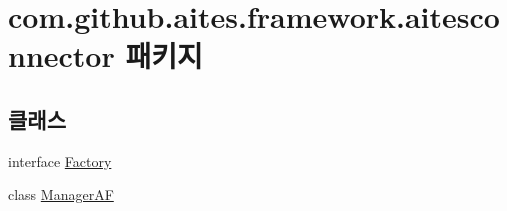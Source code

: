 \hypertarget{namespacecom_1_1github_1_1aites_1_1framework_1_1aitesconnector}{}\section{com.\+github.\+aites.\+framework.\+aitesconnector 패키지}
\label{namespacecom_1_1github_1_1aites_1_1framework_1_1aitesconnector}
\subsection*{클래스}
\begin{DoxyCompactItemize}
\item 
interface \mbox{\hyperlink{interfacecom_1_1github_1_1aites_1_1framework_1_1aitesconnector_1_1_factory}{Factory}}
\item 
class \mbox{\hyperlink{classcom_1_1github_1_1aites_1_1framework_1_1aitesconnector_1_1_manager_a_f}{Manager\+AF}}
\end{DoxyCompactItemize}
